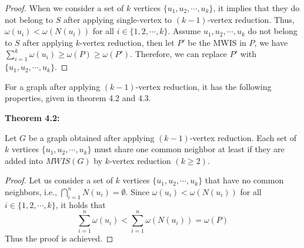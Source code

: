 \documentclass[sigconf, nonacm]{acmart}
\begin{document}
\begin{proof}
When we consider a set of $k$ vertices $\{u_1, u_2, \cdots, u_k\}$, it implies that they do not belong to $S$ after applying single-vertex to $(k-1)$-vertex reduction. Thus, $\omega(u_i)<\omega(N(u_i))$ for all $i\in\{1,2,\cdots,k\}$. Assume $u_1, u_2, \cdots, u_k$ do not belong to $S$ after applying $k$-vertex reduction, then let $P'$ be the MWIS in $P$, we have $\sum_{i=1}^k\omega(u_i)\geq\omega(P)\geq\omega(P')$. Therefore, we can replace $P'$ with $\{u_1, u_2, \cdots, u_k\}$.
\end{proof}

For a graph after applying $(k-1)$-vertex reduction, it has the following properties, given in theorem 4.2 and 4.3.

\begin{framed}
\noindent\textbf{Theorem 4.2:}

Let $G$ be a graph obtained after applying $(k-1)$-vertex reduction. Each set of $k$ vertices $\{u_1, u_2, \cdots, u_k\}$ must share one common neighbor at least if they are added into $MWIS(G)$ by $k$-vertex reduction $(k\geq 2)$.
\end{framed}

\begin{proof}
Let us consider a set of $k$ vertices $\{u_1, u_2, \cdots, u_k\}$ that have no common neighbors, i.e., $\bigcap_{i=1}^nN(u_i)=\emptyset$. Since $\omega(u_i)<\omega(N(u_i))$ for all $i\in\{1,2,\cdots,k\}$, it holds that 
$$\sum_{i=1}^n\omega(u_i) < \sum_{i=1}^n\omega(N(u_i)) = \omega(P)$$ 
Thus the proof is achieved.
\end{proof}
\end{document}
